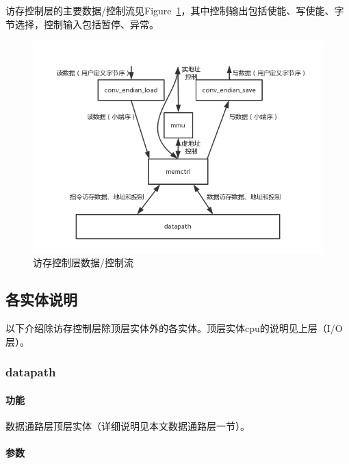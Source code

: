 \documentclass{article}
\begin{document}
\begin{spacing}{1.4}
访存控制层的主要数据/控制流见Figure~\ref{fig:mem-data-flow}，其中控制输出包括使能、写使能、字节选择，控制输入包括暂停、异常。

\begin{figure}[!htb]
	\centering
	\includegraphics[width=.8\textwidth]{mem-data-flow.png}
	\caption{访存控制层数据/控制流}
    \label{fig:mem-data-flow}
\end{figure}

\subsection{各实体说明}

以下介绍除访存控制层除顶层实体外的各实体。顶层实体cpu的说明见上层（I/O层）。

\subsubsection{datapath}

\paragraph{功能}\mbox{}

数据通路层顶层实体（详细说明见本文数据通路层一节）。

\paragraph{参数}\mbox{}


\end{spacing}
\end{document}
